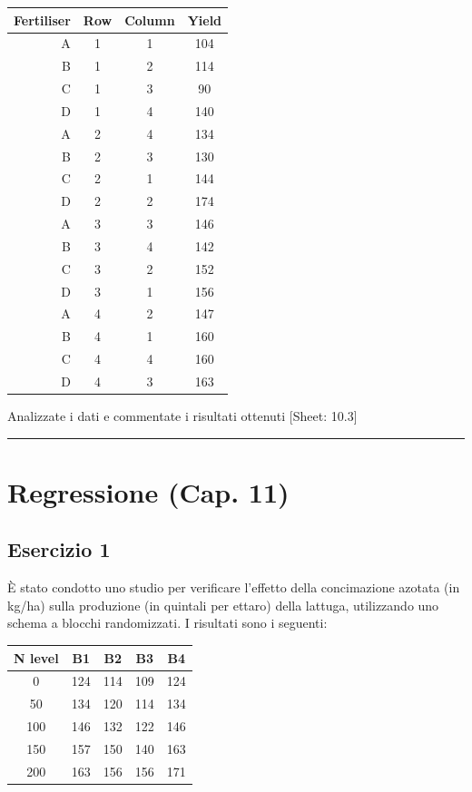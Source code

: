 \documentclass[a4paper,12pt,oneside]{book}
\begin{document}
\begin{longtable}[]{@{}rccc@{}}
\toprule()
Fertiliser & Row & Column & Yield \\
\midrule()
\endhead
A & 1 & 1 & 104 \\
B & 1 & 2 & 114 \\
C & 1 & 3 & 90 \\
D & 1 & 4 & 140 \\
A & 2 & 4 & 134 \\
B & 2 & 3 & 130 \\
C & 2 & 1 & 144 \\
D & 2 & 2 & 174 \\
A & 3 & 3 & 146 \\
B & 3 & 4 & 142 \\
C & 3 & 2 & 152 \\
D & 3 & 1 & 156 \\
A & 4 & 2 & 147 \\
B & 4 & 1 & 160 \\
C & 4 & 4 & 160 \\
D & 4 & 3 & 163 \\
\bottomrule()
\end{longtable}

Analizzate i dati e commentate i risultati ottenuti
{[}Sheet: 10.3{]}

\begin{center}\rule{0.5\linewidth}{0.5pt}\end{center}

\hypertarget{regressione-cap.-11}{%
\section{Regressione (Cap. 11)}\label{regressione-cap.-11}}

\hypertarget{esercizio-1-7}{%
\subsection{Esercizio 1}\label{esercizio-1-7}}

È stato condotto uno studio per verificare l'effetto della concimazione azotata (in kg/ha) sulla produzione (in quintali per ettaro) della lattuga, utilizzando uno schema a blocchi randomizzati. I risultati sono i seguenti:

\begin{longtable}[]{@{}ccccc@{}}
\toprule()
N level & B1 & B2 & B3 & B4 \\
\midrule()
\endhead
0 & 124 & 114 & 109 & 124 \\
50 & 134 & 120 & 114 & 134 \\
100 & 146 & 132 & 122 & 146 \\
150 & 157 & 150 & 140 & 163 \\
200 & 163 & 156 & 156 & 171 \\
\bottomrule()
\end{longtable}
\end{document}
